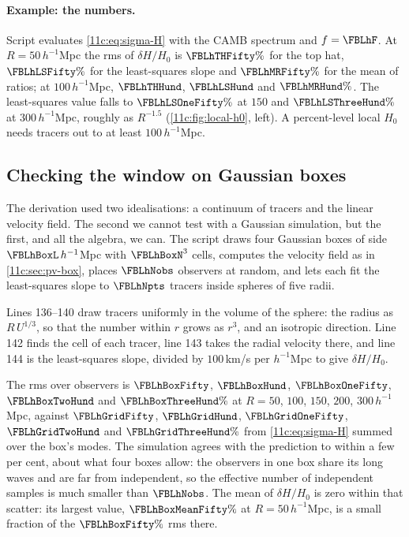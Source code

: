 \paragraph{Example: the numbers.} Script 
evaluates \eqref{11c:eq:sigma-H} with the CAMB spectrum and $f=\FBLhF$. At
$R=50\,h^{-1}$Mpc the rms of $\delta H/H_0$ is $\FBLhTHFifty\%$ for the top hat,
$\FBLhLSFifty\%$ for the least-squares slope and $\FBLhMRFifty\%$ for the mean of ratios;
at $100\,h^{-1}$Mpc, $\FBLhTHHund$, $\FBLhLSHund$ and $\FBLhMRHund\%$. The least-squares
value falls to $\FBLhLSOneFifty\%$ at $150$ and $\FBLhLSThreeHund\%$ at $300\,h^{-1}$Mpc,
roughly as $R^{-1.5}$ (\cref{11c:fig:local-h0}, left). A percent-level local $H_0$
needs tracers out to at least $100\,h^{-1}$Mpc.

\subsection{Checking the window on Gaussian boxes}
\label{11c:sec:window-box}

The derivation used two idealisations: a continuum of tracers and the linear
velocity field. The second we cannot test with a Gaussian simulation, but the
first, and all the algebra, we can. The script draws four Gaussian boxes of side
$\FBLhBoxL\,h^{-1}$Mpc with $\FBLhBoxN^3$ cells, computes the velocity field as in
\cref{11c:sec:pv-box}, places $\FBLhNobs$ observers at random, and lets each fit the
least-squares slope to $\FBLhNpts$ tracers inside spheres of five radii.


\noindent Lines 136--140 draw tracers uniformly in the volume of the sphere: the
radius as $R\,U^{1/3}$, so that the number within $r$ grows as $r^3$, and an
isotropic direction. Line 142 finds the cell of each tracer, line 143 takes the
radial velocity there, and line 144 is the least-squares slope, divided by
$100$\,km/s per $h^{-1}$Mpc to give $\delta H/H_0$.

The rms over observers is $\FBLhBoxFifty$, $\FBLhBoxHund$, $\FBLhBoxOneFifty$,
$\FBLhBoxTwoHund$ and $\FBLhBoxThreeHund\%$ at $R=50$, $100$, $150$, $200$, $300\,h^{-1}$Mpc,
against $\FBLhGridFifty$, $\FBLhGridHund$, $\FBLhGridOneFifty$, $\FBLhGridTwoHund$ and
$\FBLhGridThreeHund\%$ from \eqref{11c:eq:sigma-H} summed over the box's modes. The
simulation agrees with the prediction to within a few per cent, about what four
boxes allow: the observers in one box share its long waves and
are far from independent, so the effective number of independent samples is much
smaller than $\FBLhNobs$. The mean of $\delta H/H_0$ is zero within that scatter: its
largest value, $\FBLhBoxMeanFifty\%$ at $R=50\,h^{-1}$Mpc, is a small fraction of the
$\FBLhBoxFifty\%$ rms there.

